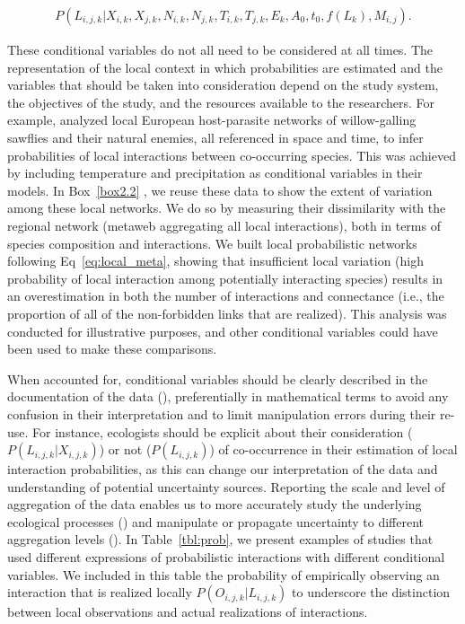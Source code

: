 \begin{eqnarray}
  \label{eq:local}
  P(L_{i, j, k} | X_{i,k}, X_{j,k}, N_{i,k}, N_{j,k}, T_{i,k}, T_{j,k},
E_k, A_0, t_0, f(L_k), M_{i, j}).
\end{eqnarray}

These conditional variables do not all need to be considered at all times. The
representation of the local context in which probabilities are estimated and the
variables that should be taken into consideration depend on the study system,
the objectives of the study, and the resources available to the researchers. For
example, \textcite{Gravel2019Bringing} analyzed local European host-parasite
networks of willow-galling sawflies and their natural enemies, all referenced in
space and time, to infer probabilities of local interactions between
co-occurring species. This was achieved by including temperature and
precipitation as conditional variables in their models. In Box~\ref{box2.2} , we
reuse these data to show the extent of variation among these local networks. We
do so by measuring their dissimilarity with the regional network (metaweb
aggregating all local interactions), both in terms of species composition and
interactions. We built local probabilistic networks following
Eq~\ref{eq:local_meta}, showing that insufficient local variation (high
probability of local interaction among potentially interacting species) results
in an overestimation in both the number of interactions and connectance (i.e.,
the proportion of all of the non-forbidden links that are realized). This
analysis was conducted for illustrative purposes, and other conditional
variables could have been used to make these comparisons.

When accounted for, conditional variables should be clearly described in the
documentation of the data (\cite{Brimacombe2023Shortcomings}), preferentially in
mathematical terms to avoid any confusion in their interpretation and to limit
manipulation errors during their re-use. For instance, ecologists should be
explicit about their consideration  ($P(L_{i, j, k} | X_{i,j,k})$) or not
($P(L_{i, j, k})$) of co-occurrence in their estimation of local interaction
probabilities, as this can change our interpretation of the data and
understanding of potential uncertainty sources. Reporting the scale and level of
aggregation of the data enables us to more accurately study the underlying
ecological processes (\cite{Clark2011Individualscale}) and manipulate or
propagate uncertainty to different aggregation levels
(\cite{Simmonds2024Recommendations}). In Table~\ref{tbl:prob}, we present
examples of studies that used different expressions of probabilistic
interactions with different conditional variables. We included in this table the
probability of empirically observing an interaction that is realized locally
$P(O_{i, j, k} \vert L_{i, j, k})$ to underscore the distinction between local
observations and actual realizations of interactions.

